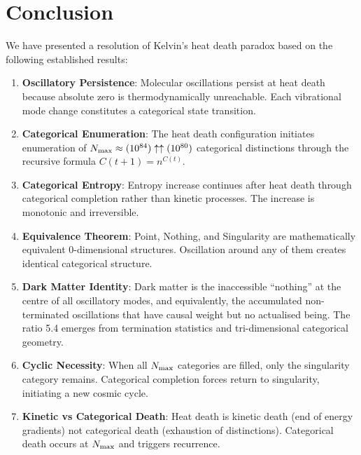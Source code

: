 \section{Conclusion}

We have presented a resolution of Kelvin's heat death paradox based on the following established results:

\begin{enumerate}
    \item \textbf{Oscillatory Persistence}: Molecular oscillations persist at heat death because absolute zero is thermodynamically unreachable. Each vibrational mode change constitutes a categorical state transition.

    \item \textbf{Categorical Enumeration}: The heat death configuration initiates enumeration of $N_{\text{max}} \approx (10^{84}) \uparrow\uparrow (10^{80})$ categorical distinctions through the recursive formula $C(t+1) = n^{C(t)}$.

    \item \textbf{Categorical Entropy}: Entropy increase continues after heat death through categorical completion rather than kinetic processes. The increase is monotonic and irreversible.

    \item \textbf{Equivalence Theorem}: Point, Nothing, and Singularity are mathematically equivalent 0-dimensional structures. Oscillation around any of them creates identical categorical structure.

    \item \textbf{Dark Matter Identity}: Dark matter is the inaccessible ``nothing'' at the centre of all oscillatory modes, and equivalently, the accumulated non-terminated oscillations that have causal weight but no actualised being. The ratio 5.4 emerges from termination statistics and tri-dimensional categorical geometry.

    \item \textbf{Cyclic Necessity}: When all $N_{\text{max}}$ categories are filled, only the singularity category remains. Categorical completion forces return to singularity, initiating a new cosmic cycle.

    \item \textbf{Kinetic vs Categorical Death}: Heat death is kinetic death (end of energy gradients) not categorical death (exhaustion of distinctions). Categorical death occurs at $N_{\text{max}}$ and triggers recurrence.


\end{enumerate}
